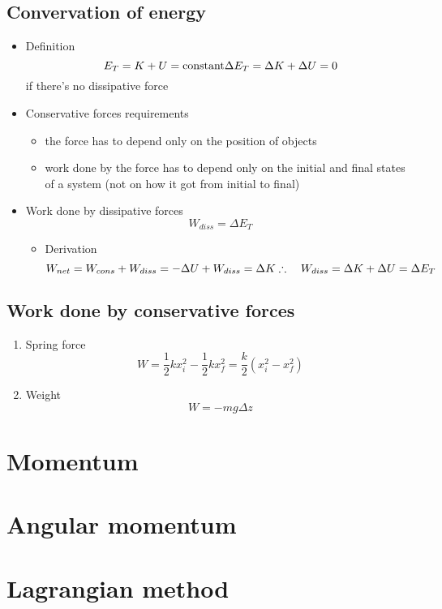     \subsection{Convervation of energy}
        \begin{itemize}
            \item Definition
                \begin{equation}
                    E_T=K+U=\textrm{constant}\\
                    \Delta E_T=\Delta K+\Delta U=0
                \end{equation}
                if there's no dissipative force
            \item Conservative forces requirements
                \begin{itemize}
                    \item the force has to depend only on the position of objects
                    \item work done by the force has to depend only on the initial and final states of a system (not on how it got from initial to final)
                \end{itemize}
            \item Work done by dissipative forces
                \begin{equation}
                    W_{diss}=\Delta E_T
                \end{equation}
                \begin{itemize}
                    \item Derivation
                        \begin{equation}
                            W_{net}=W_{cons}+W_{diss}=-\Delta U+W_{diss}=\Delta K\\
                            \therefore \quad W_{diss}=\Delta K+\Delta U=\Delta E_T
                        \end{equation}
                \end{itemize}
        \end{itemize}
    \subsection{Work done by conservative forces}
        \begin{enumerate}
            \item Spring force
                \begin{equation}
                    W=\frac{1}{2}kx_i^2-\frac{1}{2}kx_f^2=\frac{k}{2}\left(x_i^2-x_f^2\right)
                \end{equation}
            \item Weight
                \begin{equation}
                    W=-mg\Delta z
                \end{equation}
        \end{enumerate}
\section{Momentum}
\section{Angular momentum}
\section{Lagrangian method}